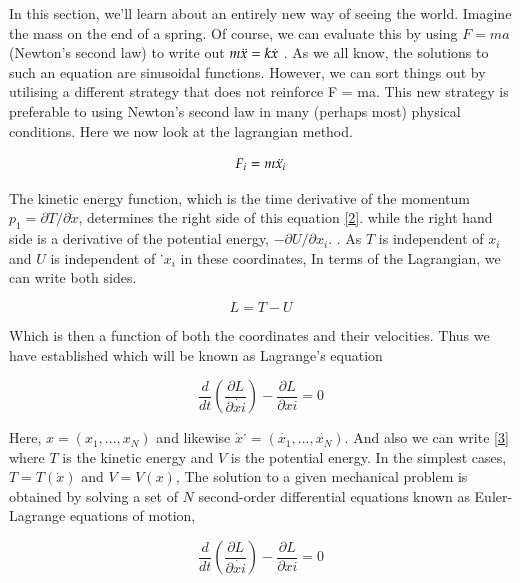 In this section, we'll learn about an entirely new way of seeing the world. Imagine the mass on the end of a spring. Of course, we can evaluate this by using $F = ma$ (Newton's second law) \cite{sharma2014isaac} to write out $m\Ddot{x} = k\Dot{x}$ \cite{zhong2019reliability}. As we all know, the solutions to such an equation are sinusoidal functions. However, we can sort things out by utilising a different strategy that does not reinforce F = ma. This new strategy is preferable to using Newton's second law in many (perhaps most) physical conditions. Here we now look at the lagrangian method. 

\begin{equation}
    \label{2}
    F_i = m\Ddot{x_i}
\end{equation}

The kinetic energy function, which is the time derivative of the momentum $p_1 = \partial T / \partial \Dot{x}$, determines the right side of this equation \eqref{2}. while the right hand side is a derivative of the potential energy, $- \partial U / \partial x_i$. . As $T$ is independent of $x_i$ and $U$ is independent of ˙$x_i$ in these coordinates, In terms of the Lagrangian, we can write both sides. 

\begin{equation}
    \label{3}
    L = T -U 
\end{equation}

Which is then a function of both the coordinates and their velocities. Thus we have established which will be known as Lagrange’s equation

\begin{equation}
    \label{4}
    \frac{d}{dt}(\frac{\partial L}{\partial \dot{xi}})-\frac{\partial L}{\partial xi} = 0 
\end{equation}

Here, $x = (x_1, . . . , x_N )$ and likewise $\dot{x}˙ = (\dot{x_1}, . . . , \dot{x_N})$. And also we can write \eqref{3} where
$T$ is the kinetic energy and $V$ is the potential energy. In the simplest cases, $T = T(\dot{x})$ and $V = V (x)$, The solution to a given mechanical problem is obtained by solving a set of $N$ second-order differential equations known as Euler-Lagrange equations of motion,

\begin{equation}
    \label{5}
    \frac{d}{dt}(\frac{\partial L}{\partial \dot{xi}})-\frac{\partial L}{\partial xi} = 0 
\end{equation}

